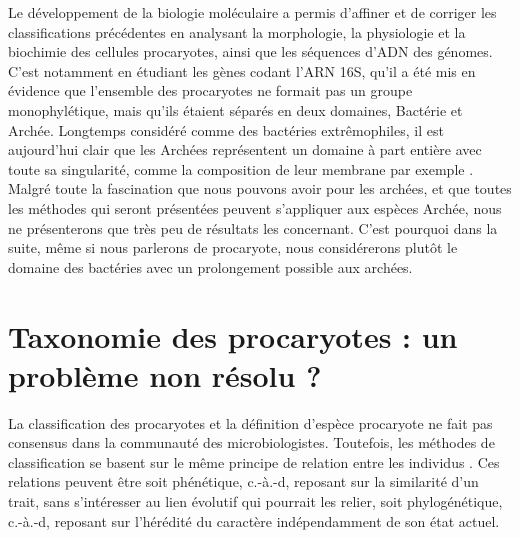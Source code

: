 Le développement de la biologie moléculaire a permis d'affiner et de corriger les classifications précédentes en analysant la morphologie, la physiologie et la biochimie des cellules procaryotes, ainsi que les séquences d'ADN des génomes. C'est notamment en étudiant les gènes codant l'ARN 16S, qu'il a été mis en évidence que l'ensemble des procaryotes ne formait pas un groupe monophylétique, mais qu'ils étaient séparés en deux domaines, Bactérie et Archée\cite{woese_phylogenetic_1977}. Longtemps considéré comme des bactéries extrêmophiles, il est aujourd'hui clair que les Archées représentent un domaine à part entière avec toute sa singularité, comme la composition de leur membrane par exemple \cite{albers_archaeal_2011}. Malgré toute la fascination que nous pouvons avoir pour les archées, et que toutes les méthodes qui seront présentées peuvent s'appliquer aux espèces Archée, nous ne présenterons que très peu de résultats les concernant. C'est pourquoi dans la suite, même si nous parlerons de procaryote, nous considérerons plutôt le domaine des bactéries avec un prolongement possible aux archées.

\section{Taxonomie des procaryotes : un problème non résolu ?}

La classification des procaryotes et la définition d'espèce procaryote ne fait pas consensus dans la communauté des microbiologistes. Toutefois, les méthodes de classification se basent sur le même principe de relation entre les individus \cite{aldhebiani_species_2018}. Ces relations peuvent être soit phénétique, c.-à.-d, reposant sur la similarité d'un trait, sans s'intéresser au lien évolutif qui pourrait les relier, soit phylogénétique, c.-à.-d, reposant sur l'hérédité du caractère indépendamment de son état actuel.

